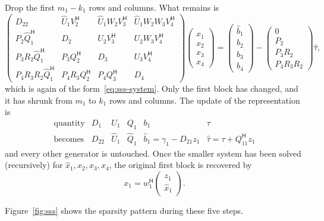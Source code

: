 \documentclass[11pt]{article}
\newcommand{\ct}{^{\mathsf H}}            %
\newcommand{\hU}{\widehat U}
\newcommand{\hQ}{\widehat Q}
\newcommand{\hx}{\hat x}
\newcommand{\hb}{\hat b}
\newcommand{\htau}{\hat\tau}
\theoremstyle{definition}
\begin{document}
Drop the first $m_1-k_1$ rows and columns. What remains is
\[
\left(\begin{array}{c|c|c|c}
D_{22} & \hU_1V_2\ct & \hU_1W_2V_3\ct & \hU_1W_2W_3V_4\ct\\[2pt]\hline
P_2\hQ_1\ct & D_2 & U_2V_3\ct & U_2W_3V_4\ct\\[2pt]\hline
P_3R_2\hQ_1\ct & P_3Q_2\ct & D_3 & U_3V_4\ct\\[2pt]\hline
P_4R_3R_2\hQ_1\ct & P_4R_3Q_2\ct & P_4Q_3\ct & D_4
\end{array}\right)
\left(\begin{array}{c} \hx_1\\[2pt]\hline x_2\\[2pt]\hline x_3\\[2pt]\hline x_4\end{array}\right)
=
\left(\begin{array}{c} \hb_1\\[2pt]\hline b_2\\[2pt]\hline b_3\\[2pt]\hline b_4\end{array}\right)
-
\left(\begin{array}{c} 0\\[2pt]\hline P_2\\[2pt]\hline P_3R_2\\[2pt]\hline P_4R_3R_2\end{array}\right)\htau ,
\]
which is again of the form~\eqref{eq:sss-system}. Only the first block has
changed, and it has shrunk from $m_1$ to $k_1$ rows and columns. The update of
the representation is
\[
\begin{array}{c|c|c|c|c|c}
\text{quantity} & D_1 & U_1 & Q_1 & b_1 & \tau\\\hline
\text{becomes} & D_{22} & \hU_1 & \hQ_1 & \hb_1=\gamma_1-D_{21}z_1 & \htau=\tau+Q_{11}\ct z_1
\end{array}
\]
and every other generator is untouched. Once the smaller system has been
solved (recursively) for $\hx_1, x_2, x_3, x_4$, the original first block is recovered by
\[
x_1 = w_1\ct\begin{pmatrix} z_1\\ \hx_1\end{pmatrix}.
\]

Figure~\ref{fig:sss} shows the sparsity pattern during these five steps.
\end{document}
